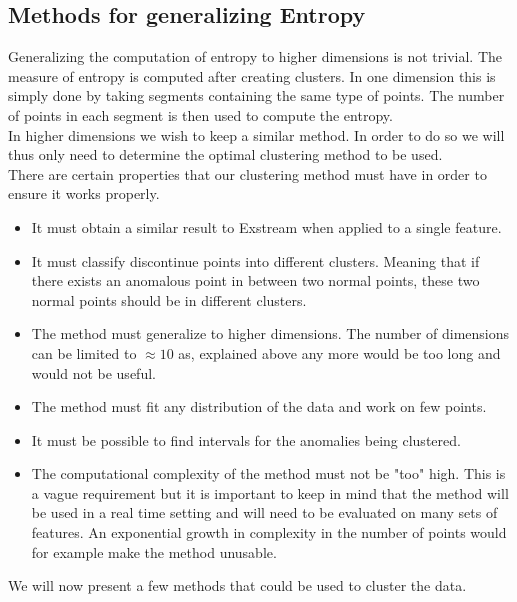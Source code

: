 \documentclass[oneside, a4paper, onecolumn, 11pt]{article}
\begin{document}
\subsection{Methods for generalizing Entropy}
Generalizing the computation of entropy to higher dimensions is not trivial. The measure of entropy is computed after creating clusters. In one dimension this is simply done by taking segments containing the same type of points. The number of points in each segment is then used to compute the entropy.\\
In higher dimensions we wish to keep a similar method. In order to do so we will thus only need to determine the optimal clustering method to be used.\\
There are certain properties that our clustering method must have in order to ensure it works properly.
\begin{itemize}
  \item It must obtain a similar result to Exstream when applied to a single feature.
  \item It must classify discontinue points into different clusters. Meaning that if there exists an anomalous point in between two normal points, these two normal points should be in different clusters.
  \item The method must generalize to higher dimensions. The number of dimensions can be limited to $\approx10$ as, explained above any more would be too long and would not be useful.
  \item The method must fit any distribution of the data and work on few points.
  \item It must be possible to find intervals for the anomalies being clustered.
  \item The computational complexity of the method must not be "too" high. This is a vague requirement but it is important to keep in mind that the method will be used in a real time setting and will need to be evaluated on many sets of features. An exponential growth in complexity in the number of points would for example make the method unusable.
\end{itemize}
We will now present a few methods that could be used to cluster the data.
\end{document}
